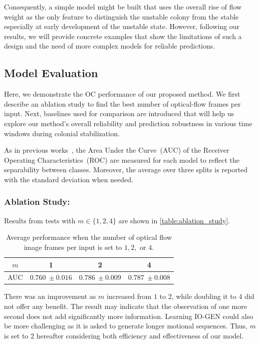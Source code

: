 \documentclass[letterpaper]{article} %
\let\orgautoref\autoref
\renewcommand{\autoref}
{\def\equationautorefname{Equation}%
	\def\figureautorefname{Fig.}%
	\def\subfigureautorefname{Fig.}%
	\def\Itemautorefname{item}%
	\def\tableautorefname{Table}%
	\def\exerciseautorefname{Exercise}%
	\def\starexerciseautorefname{Exercise}%
	\def\sectionautorefname{Section}%
	\def\subsectionautorefname{Section}%
	\def\subsubsectionautorefname{Section}%
	\def\chapterautorefname{Section}%
	\def\partautorefname{Part}%
	\orgautoref}
\begin{document}
Consequently, a simple model might be built that uses the overall rise
of flow weight as the only feature to distinguish the unstable colony
from the stable especially at early development of the unstable state.
However, following our results, we will provide concrete examples that
show the limitations of such a design and the need of more complex
models for reliable predictions.

\subsection{Model Evaluation}
\label{sec:model_evaluation}

Here, we demonstrate the OC performance of our proposed method. We first
describe an ablation study to find the best number of optical-flow
frames per input. Next, baselines used for comparison are introduced
that will help us explore our method's overall reliability and
prediction robustness in various time windows during colonial
stabilization.

As in previous works~\citep{RVGDSBMK18}, the Area Under the Curve~(AUC)
of the Receiver Operating Characteristics~(ROC) are measured for
each model to reflect the separability between classes. Moreover,
the average over three splits is reported with the standard
deviation when needed.

\subsubsection{Ablation Study:}
\label{sec:ablation_study}
Results from tests with $m \in \{1, 2, 4\}$ are shown in
\autoref{table:ablation_study}.
\setlength{\tabcolsep}{0.5em} %
{\renewcommand{\arraystretch}{1.2}%
	\begin{table}
		\centering
		\begin{tabular}{|c|c|c|c|}
			\hline
			$m$  &  1 & 2 & 4  \\ \hline\hline
			AUC & $0.760~\pm 0.016$ & $0.786~\pm 0.009$ & $0.787~\pm 0.008$
			\\ \hline
		\end{tabular}
		\caption{Average performance when the number of optical flow
		image frames per input is set to $1, 2,$ or $4$.}
		\label{table:ablation_study}
	\end{table}
}%
There was an improvement as $m$ increased from $1$ to $2$,
while doubling it to $4$ did not offer any benefit. The result may
indicate that the observation of one more second does not add
significantly more information. Learning \mbox{IO-GEN} could also be more
challenging as it is asked to generate longer motional sequences.  Thus,
$m$ is set to $2$ hereafter considering both efficiency and
effectiveness of our model.
\end{document}
